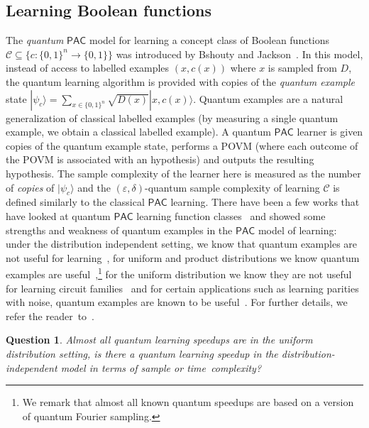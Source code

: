 \documentclass[11pt]{article}
\newcommand{\Cc}{\ensuremath{\mathcal{C}}}
\def\01{\{0,1\}}
\newcommand{\A}{\ensuremath{\mathcal{A}}}
\newcommand{\PAC}{\ensuremath{\mathsf{PAC}}}
\def\01{\{0,1\}}
\newcommand{\ket}[1]{|#1\rangle}
\newtheorem{question}{Question}
\newcommand{\snote}[1]{\footnote{\textcolor{magenta}{(Srini: #1)}}}
\begin{document}
\subsection{Learning Boolean functions}
The \emph{quantum} $\PAC$ model for learning a concept class of Boolean functions $\Cc\subseteq \{c:\01^n\rightarrow \01\}$ was introduced by Bshouty and Jackson~\cite{DBLP:conf/colt/BshoutyJ95}. In this model, instead of access to labelled examples $(x,c(x))$ where $x$ is sampled from $D$, the quantum learning algorithm is provided with copies of the \emph{quantum example} state $\ket{\psi_c}=\sum_{x\in \01^n}\sqrt{D(x)}\ket{x,c(x)}$. Quantum examples are a natural generalization of classical labelled examples (by measuring a single quantum example, we obtain a classical labelled example). A quantum $\PAC$ learner is given  copies of the quantum example state,  performs a POVM (where each outcome of the POVM is associated with an hypothesis) and outputs the resulting hypothesis.  The sample complexity of the learner here is measured as the number of \emph{copies} of $\ket{\psi_c}$ and the $(\varepsilon,\delta)$-quantum sample complexity of learning $\Cc$ is defined similarly to the classical $\PAC$ learning.  There have been a few works that have looked at quantum $\PAC$ learning function classes~\cite{DBLP:conf/colt/BshoutyJ95,atici2007quantum,arunachalam2021two,arunachalam2018optimal} and showed some strengths and weakness of quantum examples in the $\PAC$ model of learning: under the distribution independent setting, we know that quantum examples are not useful for learning~\cite{DBLP:journals/jmlr/ArunachalamW18},   for uniform and product distributions we know quantum examples are useful~\cite{atici2007quantum,arunachalam2021two,DBLP:conf/colt/BshoutyJ95,kanade2018learning},\footnote{We remark that almost all known quantum speedups are based on a version of quantum Fourier  sampling.} for the uniform distribution we know they are not useful for learning circuit families~\cite{arunachalam2022quantum} and for certain applications such as learning parities with noise, quantum examples are known to be useful~\cite{Grilo2019learning}.  For further details, we refer the reader~to~\cite{DBLP:journals/sigact/ArunachalamW17}. 
\begin{question}
   Almost all quantum learning speedups are in the uniform distribution setting, is there a quantum learning speedup in the distribution-independent model in terms of sample or time~complexity?
\end{question}
\end{document}
